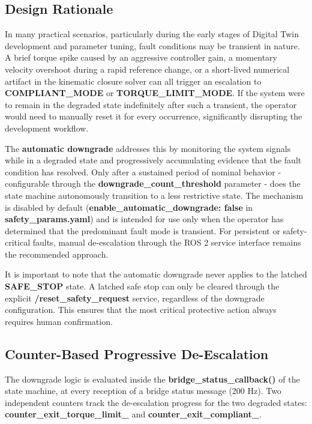 \subsection{Design Rationale}
In many practical scenarios, particularly during the early stages of Digital Twin development and parameter tuning, fault conditions may be transient in nature. A brief torque spike caused by an aggressive controller gain, a momentary velocity overshoot during a rapid reference change, or a short-lived numerical artifact in the kinematic closure solver can all trigger an escalation to \textbf{COMPLIANT\_MODE} or \textbf{TORQUE\_LIMIT\_MODE}. If the system were to remain in the degraded state indefinitely after such a transient, the operator would need to manually reset it for every occurrence, significantly disrupting the development workflow.

The \textbf{automatic downgrade} addresses this by monitoring the system signals while in a degraded state and progressively accumulating evidence that the fault condition has resolved. Only after a sustained period of nominal behavior - configurable through the \textbf{downgrade\_count\_threshold} parameter - does the state machine autonomously transition to a less restrictive state. The mechanism is disabled by default (\textbf{enable\_automatic\_downgrade: false} in \textbf{safety\_params.yaml}) and is intended for use only when the operator has determined that the predominant fault mode is transient. For persistent or safety-critical faults, manual de-escalation through the ROS 2 service interface remains the recommended approach.

It is important to note that the automatic downgrade never applies to the latched \textbf{SAFE\_STOP} state. A latched safe stop can only be cleared through the explicit \textbf{/reset\_safety\_request} service, regardless of the downgrade configuration. This ensures that the most critical protective action always requires human confirmation.

\subsection{Counter-Based Progressive De-Escalation}
The downgrade logic is evaluated inside the \textbf{bridge\_status\_callback()} of the state machine, at every reception of a bridge status message (200 Hz). Two independent counters track the de-escalation progress for the two degraded states: \textbf{counter\_exit\_torque\_limit\_} and \textbf{counter\_exit\_compliant\_}.

